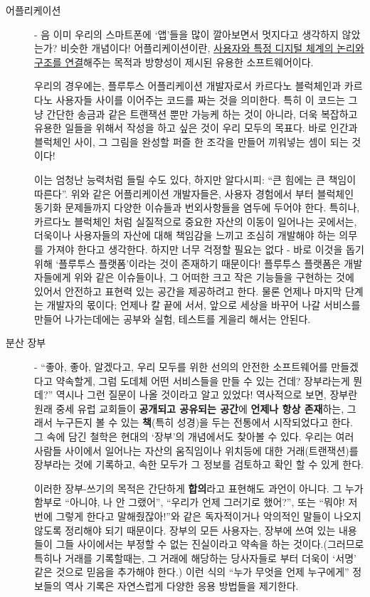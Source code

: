 \documentclass[a4paper, 11pt]{article}
\begin{document}
    \begin{description}
        \item[어플리케이션] - 음 이미 우리의 스마트폰에 `앱'들을 많이 깔아보면서 멋지다고 생각하지 않았는가? 비슷한 개념이다! 어플리케이션이란, \uline{사용자와 특정 디지털 체계의 논리와 구조를 연결}해주는 목적과 방향성이 제시된 유용한 소프트웨어이다.

        우리의 경우에는, 플루투스 어플리케이션 개발자로서 카르다노 블럭체인과 카르다노 사용자들 사이를 이어주는 코드를 짜는 것을 의미한다. 특히 이 코드는 그냥 간단한 송금과 같은 트랜잭션 뿐만 가능케 하는 것이 아니라, 더욱 복잡하고 유용한 일들을 위해서 작성을 하고 싶은 것이 우리 모두의 목표다. 바로 인간과 블럭체인 사이, 그 그림을 완성할 퍼즐 한 조각을 만들어 끼워넣는 셈이 되는 것이다!

        이는 엄청난 능력처럼 들릴 수도 있다, 하지만 알다시피: ``큰 힘에는 큰 책임이 따른다''. 위와 같은 어플리케이션 개발자들은, 사용자 경험에서 부터 블럭체인 동기화 문제들까지 다양한 이슈들과 번외사항들을 염두에 두어야 한다. 특히나, 카르다노 블럭체인 처럼 실질적으로 중요한 자산의 이동이 일어나는 곳에서는, 더욱이나 사용자들의 자산에 대해 책임감을 느끼고 조심히 개발해야 하는 의무를 가져야 한다고 생각한다. 하지만 너무 걱정할 필요는 없다 - 바로 이것을 돕기 위해 `플루투스 플랫폼'이라는 것이 존재하기 때문이다! 플루투스 플랫폼은 개발자들에게 위와 같은 이슈들이나, 그 어떠한 크고 작은 기능들을 구현하는 것에 있어서 안전하고 표현력 있는 공간을 제공하려고 한다. 물론 언제나 마지막 단계는 개발자의 몫이다; 언제나 칼 끝에 서서, 앞으로 세상을 바꾸어 나갈 서비스를 만들어 나가는데에는 공부와 실험, 테스트를 게을리 해서는 안된다. 
        
        \item[분산 장부] - ``좋아, 좋아, 알겠다고, 우리 모두를 위한 선의의 안전한 소프트웨어를 만들겠다고 약속할게, 그럼 도데체 어떤 서비스들을 만들 수 있는 건데? 장부라는게 뭔데?'' 역시나 그런 질문이 나올 것이라고 알고 있었다! 역사적으로 보면, 장부란 원래 중세 유럽 교회들이 \textbf{공개되고 공유되는 공간}에 \textbf{언제나 항상 존재}하는, 그래서 누구든지 볼 수 있는 \textbf{책}(특히 성경)을 두는 전통에서 시작되었다고 한다. 그 속에 담긴 철학은 현대의 `장부'의 개념에서도 찾아볼 수 있다. 우리는 여러 사람들 사이에서 일어나는 자산의 움직임이나 위치등에 대한 거래(트랜잭션)를 장부라는 것에 기록하고, 속한 모두가 그 정보를 검토하고 확인 할 수 있게 한다.

        이러한 장부-쓰기의 목적은 간단하게 \textbf{합의}라고 표현해도 과언이 아니다. 그 누가 함부로 ``아니야, 나 안 그랬어'', ``우리가 언제 그러기로 했어?'', 또는 ``뭐야! 저번에 그렇게 한다고 말해줬잖아!''와 같은 독자적이거나 악의적인 말들이 나오지 않도록 정리해야 되기 때문이다. 장부의 모든 사용자는, 장부에 쓰여 있는 내용들이 그들 사이에서는 부정할 수 없는 진실이라고 약속을 하는 것이다.(그러므로 특히나 거래를 기록할때는, 그 거래에 해당하는 당사자들로 부터 더욱이 `서명' 같은 것으로 믿음을 추가해야 한다.) 이런 식의 ``누가 무엇을 언제 누구에게'' 정보들의 역사 기록은 자연스럽게 다양한 응용 방법들을 제기한다.


\end{description}
\end{document}
